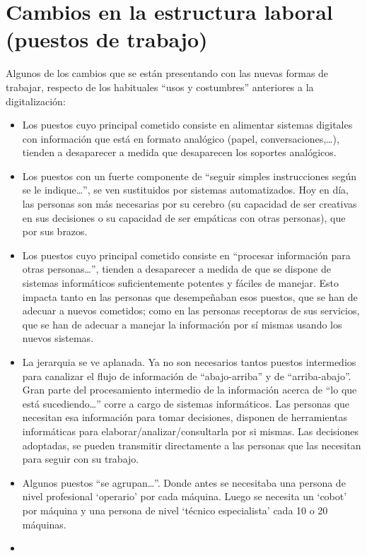 \documentclass[spanish,12pt,a4paper,final,oneside]{book}
\begin{document}
\section{Cambios en la estructura laboral (puestos de trabajo)}
Algunos de los cambios que se están presentando con las nuevas formas de trabajar, respecto de los habituales ``usos y costumbres'' anteriores a la digitalización:
\begin{itemize}
\item Los puestos cuyo principal cometido consiste en alimentar sistemas digitales con información que está en formato analógico (papel, conversaciones,\ldots), tienden a desaparecer a medida que desaparecen los soportes analógicos.
\item Los puestos con un fuerte componente de ``seguir simples instrucciones según se le indique\ldots'', se ven sustituidos por sistemas automatizados. Hoy en día, las personas son más necesarias por su cerebro (su capacidad de ser creativas en sus decisiones o su capacidad de ser empáticas con otras personas), que por sus brazos.
\item Los puestos cuyo principal cometido consiste en ``procesar información para otras personas\ldots'', tienden a desaparecer a medida de que se dispone de sistemas informáticos suficientemente potentes y fáciles de manejar. Esto impacta tanto en las personas que desempeñaban esos puestos, que se han de adecuar a nuevos cometidos; como en las personas receptoras de sus servicios, que se han de adecuar a manejar la información por sí mismas usando los nuevos sistemas.
\item La jerarquia se ve aplanada. Ya no son necesarios tantos puestos intermedios para canalizar el flujo de información de ``abajo-arriba'' y de ``arriba-abajo''. Gran parte del procesamiento intermedio de la información acerca de ``lo que está sucediendo\ldots'' corre a cargo de sistemas informáticos. Las personas que necesitan esa información para tomar decisiones, disponen de herramientas informáticas para elaborar/analizar/consultarla por si mismas. Las decisiones adoptadas, se pueden transmitir directamente a las personas que las necesitan para seguir con su trabajo.
\item Algunos puestos ``se agrupan\ldots''. Donde antes se necesitaba una persona de nivel profesional `operario' por cada máquina. Luego se necesita un `cobot' por máquina y una persona de nivel `técnico especialista' cada 10 o 20 máquinas.
\item
\end{itemize}
\end{document}
